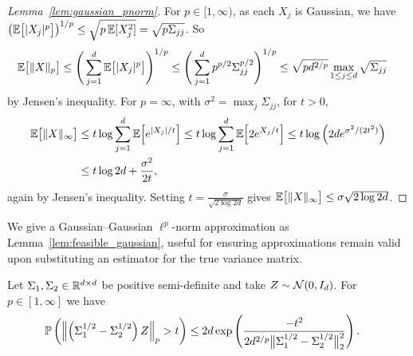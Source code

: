 \begin{proof}[Lemma~\ref{lem:gaussian_pnorm}]

  For $p \in [1, \infty)$,
  as each $X_j$ is Gaussian, we have
  $\big(\E\big[|X_j|^p\big]\big)^{1/p}
  \leq \sqrt{p\, \E[X_j^2]}
  = \sqrt{p \Sigma_{j j}}$.
  So
  \begin{align*}
    \E\big[\|X\|_p\big]
    &\leq
    \Bigg(\sum_{j=1}^d \E \big[ |X_j|^p \big] \Bigg)^{1/p}
    \leq \Bigg(\sum_{j=1}^d p^{p/2} \Sigma_{j j}^{p/2} \Bigg)^{1/p}
    \leq \sqrt{p d^{2/p}}
    \max_{1\leq j\leq d}
    \sqrt{\Sigma_{j j}}
  \end{align*}
  by Jensen's inequality.
  For $p=\infty$,
  with $\sigma^2 = \max_j \Sigma_{j j}$,
  for $t>0$,
  \begin{align*}
    \E\big[\|X\|_\infty \big]
    &\leq
    t
    \log
    \sum_{j=1}^d
    \E\Big[
      e^{|X_j| / t}
    \Big]
    \leq
    t
    \log
    \sum_{j=1}^d
    \E\Big[
      2 e^{X_j / t}
    \Big]
    \leq t \log \Big(2 d e^{\sigma^2/(2t^2)}\Big) \\
    &\leq t \log 2 d + \frac{\sigma^2}{2t},
  \end{align*}
  again by Jensen's inequality.
  Setting $t = \frac{\sigma}{\sqrt{2 \log 2d}}$ gives
  $\E\big[\|X\|_\infty \big] \leq \sigma \sqrt{2 \log 2d}$.
\end{proof}

We give a Gaussian--Gaussian $\ell^p$-norm approximation
as Lemma~\ref{lem:feasible_gaussian}, useful for
ensuring approximations remain valid upon substituting
an estimator for the true variance matrix.

\begin{lemma}%
  \label{lem:feasible_gaussian}

  Let $\Sigma_1, \Sigma_2 \in \R^{d \times d}$ be positive semi-definite
  and take $Z \sim \cN(0, I_d)$.
  For $p \in [1, \infty]$ we have
  \begin{align*}
    \P\left(
      \left\|
      \left(\Sigma_1^{1/2} - \Sigma_2^{1/2}\right) Z
      \right\|_p
      > t
    \right)
    &\leq
    2 d \exp \left(
      \frac{-t^2}
      {2 d^{2/p} \big\|\Sigma_1^{1/2} - \Sigma_2^{1/2}\big\|_2^2}
    \right).
  \end{align*}

\end{lemma}

